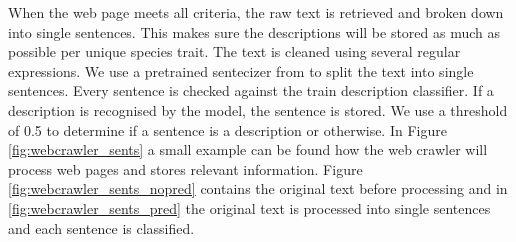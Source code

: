 \documentclass[a4paper, 12pt, oneside]{book} %
\begin{document}
When the web page meets all criteria, the raw text is retrieved and broken down into single sentences. 
This makes sure the descriptions will be stored as much as possible per unique species trait.
The text is cleaned using several regular expressions. %
We use a pretrained sentecizer from \textcite{wolf_huggingfaces_2020} to split the text into single sentences.
Every sentence is checked against the train description classifier.
If a description is recognised by the model, the sentence is stored.
We use a threshold of 0.5 to determine if a sentence is a description or otherwise.
In Figure \ref{fig:webcrawler_sents} a small example can be found how the web crawler will process web pages and stores relevant information. 
Figure \ref{fig:webcrawler_sents_nopred} contains the original text before processing and in \ref{fig:webcrawler_sents_pred} the original text is processed into single sentences and each sentence is classified.
\end{document}

